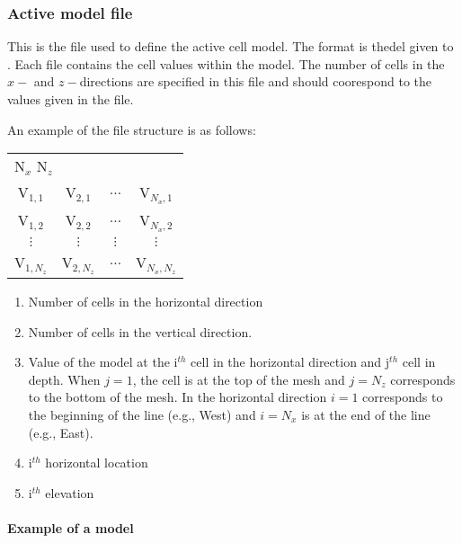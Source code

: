 \subsubsection{Active model file}

This is the file used to define the active cell model. The format is thedel given to . Each file contains the cell values within the model. The number of cells in the $x-$ and $z-$directions are specified in this file and should coorespond to the values given in the  file.

An example of the  file structure is as follows:

\begin{fileExample}
\begin{tabular}{|cccc|}
\hline
\multicolumn{4}{|l|}{N$_x$ N$_z$} \\
V$_{1,1}$ & V$_{2,1}$ & $\hdots$ & V$_{N_x,1}$ \\
V$_{1,2}$ & V$_{2,2}$ & $\hdots$ & V$_{N_x,2}$ \\
$\vdots$ &  $\vdots$ &  $\vdots$ &  $\vdots$ \\
V$_{1,N_z}$ & V$_{2,N_z}$ & $\hdots$ & V$_{N_x,N_z}$ \\
\hline
\end{tabular}
\end{fileExample}

\begin{enumerate}
\item[\codeName{N$_x$}] Number of cells in the horizontal direction
\item[\codeName{N$_z$}] Number of cells in the vertical direction. 
\item[\codeName{V$_{i,k}$ }] Value of the model at the i$^{th}$ cell in the horizontal direction and j$^{th}$ cell in depth. When $j=1$, the cell is at the top of the mesh and $j=N_z$ corresponds to the bottom of the mesh. In the horizontal direction $i=1$ corresponds to the beginning of the line (e.g., West) and $i=N_x$ is at the end of the line (e.g., East). 
\item[\codeName{X$_i$}] i$^{th}$ horizontal location 
\item[\codeName{elev$_i$}] i$^{th}$ elevation
\end{enumerate}

\paragraph{Example of a model} 

